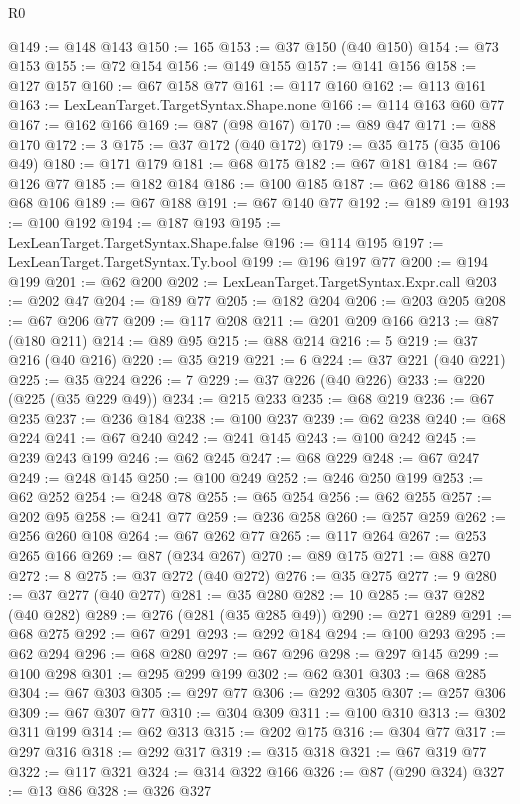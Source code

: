 \begin{lexlean}{R0}
\begin{coremodule}
@149 := @148 @143
@150 := 165
@153 := @37 @150 (@40 @150)
@154 := @73 @153
@155 := @72 @154
@156 := @149 @155
@157 := @141 @156
@158 := @127 @157
@160 := @67 @158 @77
@161 := @117 @160
@162 := @113 @161
@163 := LexLeanTarget.TargetSyntax.Shape.none
@166 := @114 @163 @60 @77
@167 := @162 @166
@169 := @87 (@98 @167)
@170 := @89 @47
@171 := @88 @170
@172 := 3
@175 := @37 @172 (@40 @172)
@179 := @35 @175 (@35 @106 @49)
@180 := @171 @179
@181 := @68 @175
@182 := @67 @181
@184 := @67 @126 @77
@185 := @182 @184
@186 := @100 @185
@187 := @62 @186
@188 := @68 @106
@189 := @67 @188
@191 := @67 @140 @77
@192 := @189 @191
@193 := @100 @192
@194 := @187 @193
@195 := LexLeanTarget.TargetSyntax.Shape.false
@196 := @114 @195
@197 := LexLeanTarget.TargetSyntax.Ty.bool
@199 := @196 @197 @77
@200 := @194 @199
@201 := @62 @200
@202 := LexLeanTarget.TargetSyntax.Expr.call
@203 := @202 @47
@204 := @189 @77
@205 := @182 @204
@206 := @203 @205
@208 := @67 @206 @77
@209 := @117 @208
@211 := @201 @209 @166
@213 := @87 (@180 @211)
@214 := @89 @95
@215 := @88 @214
@216 := 5
@219 := @37 @216 (@40 @216)
@220 := @35 @219
@221 := 6
@224 := @37 @221 (@40 @221)
@225 := @35 @224
@226 := 7
@229 := @37 @226 (@40 @226)
@233 := @220 (@225 (@35 @229 @49))
@234 := @215 @233
@235 := @68 @219
@236 := @67 @235
@237 := @236 @184
@238 := @100 @237
@239 := @62 @238
@240 := @68 @224
@241 := @67 @240
@242 := @241 @145
@243 := @100 @242
@245 := @239 @243 @199
@246 := @62 @245
@247 := @68 @229
@248 := @67 @247
@249 := @248 @145
@250 := @100 @249
@252 := @246 @250 @199
@253 := @62 @252
@254 := @248 @78
@255 := @65 @254
@256 := @62 @255
@257 := @202 @95
@258 := @241 @77
@259 := @236 @258
@260 := @257 @259
@262 := @256 @260 @108
@264 := @67 @262 @77
@265 := @117 @264
@267 := @253 @265 @166
@269 := @87 (@234 @267)
@270 := @89 @175
@271 := @88 @270
@272 := 8
@275 := @37 @272 (@40 @272)
@276 := @35 @275
@277 := 9
@280 := @37 @277 (@40 @277)
@281 := @35 @280
@282 := 10
@285 := @37 @282 (@40 @282)
@289 := @276 (@281 (@35 @285 @49))
@290 := @271 @289
@291 := @68 @275
@292 := @67 @291
@293 := @292 @184
@294 := @100 @293
@295 := @62 @294
@296 := @68 @280
@297 := @67 @296
@298 := @297 @145
@299 := @100 @298
@301 := @295 @299 @199
@302 := @62 @301
@303 := @68 @285
@304 := @67 @303
@305 := @297 @77
@306 := @292 @305
@307 := @257 @306
@309 := @67 @307 @77
@310 := @304 @309
@311 := @100 @310
@313 := @302 @311 @199
@314 := @62 @313
@315 := @202 @175
@316 := @304 @77
@317 := @297 @316
@318 := @292 @317
@319 := @315 @318
@321 := @67 @319 @77
@322 := @117 @321
@324 := @314 @322 @166
@326 := @87 (@290 @324)
@327 := @13 @86
@328 := @326 @327

\end{coremodule}
\end{lexlean}

